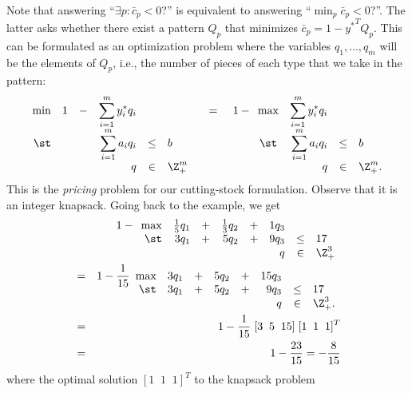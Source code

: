 Note that answering ``$\exists p : \bar c_p < 0$?'' is equivalent
to answering ``$\min_p \bar c_p < 0$?''. The latter asks whether
there exist a pattern $Q_p$ that minimizes $\bar c_p = 1 - {y^*}^T Q_p$.
This can be formulated as an optimization problem where the
variables $q_1, \ldots, q_m$ will be the elements of $Q_p$, i.e.,
the number of pieces of each type that we take in the pattern:
\[
\begin{array}[t]{rrcrcl}
\min & 1 & - & \displaystyle \sum_{i=1}^m y^*_i q_i & & \\
\st  &   &   & \displaystyle \sum_{i=1}^m   a_i q_i & \leq & b \\
     &   &   &                                    q & \in  & \Z^m_+
\end{array}
\;\;\;\; = \;\;\;\;
1 - \begin{array}[t]{crcl}
\max & \displaystyle \sum_{i=1}^m y^*_i q_i & & \\
\st  & \displaystyle \sum_{i=1}^m   a_i q_i & \leq & b \\
     &                                    q & \in  & \Z^m_+.
\end{array}
\]
This is the \emph{pricing} problem for our cutting-stock formulation.
Observe that it is an integer knapsack.
Going back to the example, we get
\begin{eqnarray*}
&   & 1 - \begin{array}[t]{rrcrcrcl}
	\max & \frac{1}{5} q_1 & + & \frac{1}{3} q_2 & + &  1 q_3 & & \\
	\st  &           3 q_1 & + &           5 q_2 & + &  9 q_3 & \leq & 17 \\
	     &                 &   &                 &   &    q   & \in  & \Z^3_+
	\end{array} \\
& = & 1 - \frac{1}{15} \begin{array}[t]{rrcrcrcl}
	\max &           3 q_1 & + &           5 q_2 & + & 15 q_3 & & \\
	\st  &           3 q_1 & + &           5 q_2 & + &  9 q_3 & \leq & 17 \\
	     &                 &   &                 &   &    q   & \in  & \Z^3_+.
	\end{array} \\
& = & 1 - \frac{1}{15} \; [ 3 \;\; 5 \;\; 15 ] \; [ 1 \;\; 1 \;\; 1 ]^T \\
& = & 1 - \frac{23}{15} = - \frac{8}{15}
\end{eqnarray*}
where the optimal solution $[ 1 \;\; 1 \;\; 1 ]^T$ to the knapsack problem
